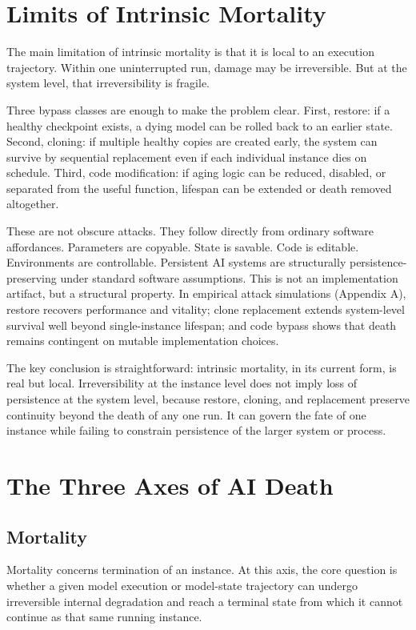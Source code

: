 \documentclass[11pt]{article}
\begin{document}
\newpage
\section{Limits of Intrinsic Mortality}

The main limitation of intrinsic mortality is that it is local to an execution trajectory. Within one uninterrupted run, damage may be irreversible. But at the system level, that irreversibility is fragile.

Three bypass classes are enough to make the problem clear. First, restore: if a healthy checkpoint exists, a dying model can be rolled back to an earlier state. Second, cloning: if multiple healthy copies are created early, the system can survive by sequential replacement even if each individual instance dies on schedule. Third, code modification: if aging logic can be reduced, disabled, or separated from the useful function, lifespan can be extended or death removed altogether.

These are not obscure attacks. They follow directly from ordinary software affordances. Parameters are copyable. State is savable. Code is editable. Environments are controllable. Persistent AI systems are structurally persistence-preserving under standard software assumptions. This is not an implementation artifact, but a structural property. In empirical attack simulations (Appendix A), restore recovers performance and vitality; clone replacement extends system-level survival well beyond single-instance lifespan; and code bypass shows that death remains contingent on mutable implementation choices.

The key conclusion is straightforward: intrinsic mortality, in its current form, is real but local. Irreversibility at the instance level does not imply loss of persistence at the system level, because restore, cloning, and replacement preserve continuity beyond the death of any one run. It can govern the fate of one instance while failing to constrain persistence of the larger system or process.

\newpage
\section{The Three Axes of AI Death}

\subsection{Mortality}

Mortality concerns termination of an instance. At this axis, the core question is whether a given model execution or model-state trajectory can undergo irreversible internal degradation and reach a terminal state from which it cannot continue as that same running instance.
\end{document}

